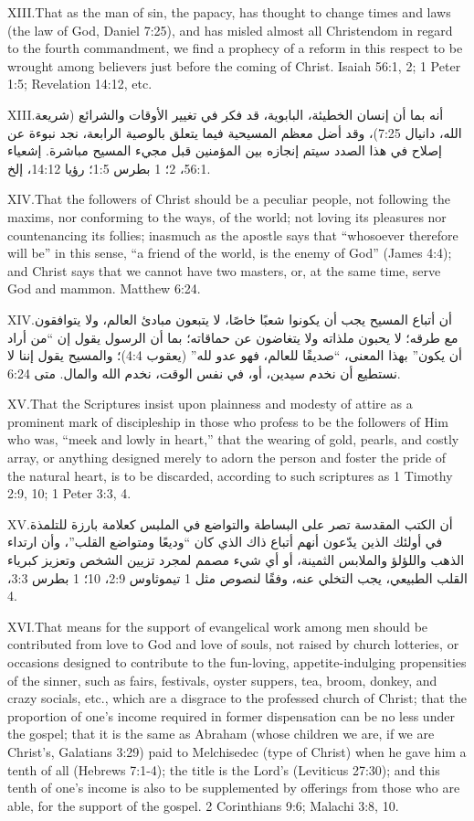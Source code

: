 \lettrine{XIII.} That as the man of sin, the papacy, has thought to change times and laws (the law of God, Daniel 7:25), and has misled almost all Christendom in regard to the fourth commandment, we find a prophecy of a reform in this respect to be wrought among believers just before the coming of Christ. Isaiah 56:1, 2; 1 Peter 1:5; Revelation 14:12, etc.


\lettrine{XIII.} أنه بما أن إنسان الخطيئة، البابوية، قد فكر في تغيير الأوقات والشرائع (شريعة الله، دانيال 7:25)، وقد أضل معظم المسيحية فيما يتعلق بالوصية الرابعة، نجد نبوءة عن إصلاح في هذا الصدد سيتم إنجازه بين المؤمنين قبل مجيء المسيح مباشرة. إشعياء 56:1، 2؛ 1 بطرس 1:5؛ رؤيا 14:12، إلخ.


\lettrine{XIV.} That the followers of Christ should be a peculiar people, not following the maxims, nor conforming to the ways, of the world; not loving its pleasures nor countenancing its follies; inasmuch as the apostle says that “whosoever therefore will be” in this sense, “a friend of the world, is the enemy of God” (James 4:4); and Christ says that we cannot have two masters, or, at the same time, serve God and mammon. Matthew 6:24.


\lettrine{XIV.} أن أتباع المسيح يجب أن يكونوا شعبًا خاصًا، لا يتبعون مبادئ العالم، ولا يتوافقون مع طرقه؛ لا يحبون ملذاته ولا يتغاضون عن حماقاته؛ بما أن الرسول يقول إن “من أراد أن يكون” بهذا المعنى، “صديقًا للعالم، فهو عدو لله” (يعقوب 4:4)؛ والمسيح يقول إننا لا نستطيع أن نخدم سيدين، أو، في نفس الوقت، نخدم الله والمال. متى 6:24.


\lettrine{XV.} That the Scriptures insist upon plainness and modesty of attire as a prominent mark of discipleship in those who profess to be the followers of Him who was, “meek and lowly in heart,” that the wearing of gold, pearls, and costly array, or anything designed merely to adorn the person and foster the pride of the natural heart, is to be discarded, according to such scriptures as 1 Timothy 2:9, 10; 1 Peter 3:3, 4.


\lettrine{XV.} أن الكتب المقدسة تصر على البساطة والتواضع في الملبس كعلامة بارزة للتلمذة في أولئك الذين يدّعون أنهم أتباع ذاك الذي كان “وديعًا ومتواضع القلب”، وأن ارتداء الذهب واللؤلؤ والملابس الثمينة، أو أي شيء مصمم لمجرد تزيين الشخص وتعزيز كبرياء القلب الطبيعي، يجب التخلي عنه، وفقًا لنصوص مثل 1 تيموثاوس 2:9، 10؛ 1 بطرس 3:3، 4.


\lettrine{XVI.} That means for the support of evangelical work among men should be contributed from love to God and love of souls, not raised by church lotteries, or occasions designed to contribute to the fun-loving, appetite-indulging propensities of the sinner, such as fairs, festivals, oyster suppers, tea, broom, donkey, and crazy socials, etc., which are a disgrace to the professed church of Christ; that the proportion of one’s income required in former dispensation can be no less under the gospel; that it is the same as Abraham (whose children we are, if we are Christ’s, Galatians 3:29) paid to Melchisedec (type of Christ) when he gave him a tenth of all (Hebrews 7:1-4); the title is the Lord’s (Leviticus 27:30); and this tenth of one’s income is also to be supplemented by offerings from those who are able, for the support of the gospel. 2 Corinthians 9:6; Malachi 3:8, 10.


